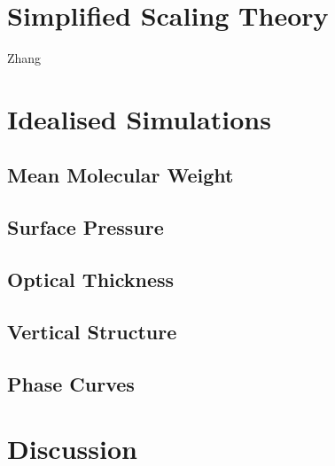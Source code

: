 \section{Simplified Scaling Theory}

Zhang





\section{Idealised Simulations}

\subsection{Mean Molecular Weight}

\subsection{Surface Pressure}

\subsection{Optical Thickness}

\subsection{Vertical Structure}

\subsection{Phase Curves}



\section{Discussion}

\subsection*{}


%








% 
% 
